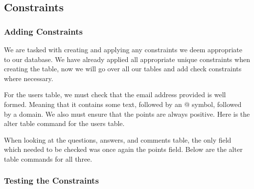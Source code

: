 \subsection{Constraints}

\subsubsection{Adding Constraints}

We are tasked with creating and applying any constraints we deem appropriate to our database. We have already applied all appropriate unique constraints when creating the table, now we will go over all our tables and add check constraints where necessary.

For the users table, we must check that the email address provided is well formed. Meaning that it contains some text, followed by an @ symbol, followed by a domain. We also must ensure that the points are always positive. Here is the alter table command for the users table.


When looking at the questions, answers, and comments table, the only field which needed to be checked was once again the points field. Below are the alter table commands for all three.


\subsubsection{Testing the Constraints}